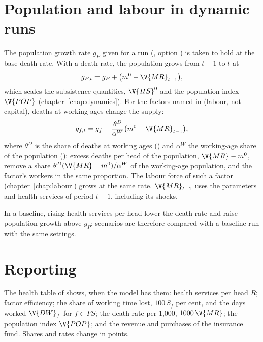 \section{Population and labour in dynamic runs}\label{sec:population}

The population growth rate $g_P$ given for a run (,
option ) is taken to hold at the base death rate. With a
death rate, the population grows from $t - 1$ to $t$ at
\begin{equation*}
g_{P,t} = g_P + \bigl(m^0 - \V{MR}_{t-1}\bigr),
\end{equation*}
which scales the subsistence quantities, $\V{HS}^0$ and the population index
$\V{POP}$ (chapter~\ref{chap:dynamics}). For the factors named in
 (labour, not capital), deaths at working ages change the
supply:
\begin{equation*}
g_{f,t} = g_f + \frac{\theta^D}{\alpha^W}\bigl(m^0 - \V{MR}_{t-1}\bigr),
\end{equation*}
where $\theta^D$ is the share of deaths at working ages ()
and $\alpha^W$ the working-age share of the population ():
excess deaths per head of the population, $\V{MR} - m^0$, remove a share
$\theta^D(\V{MR} - m^0)/\alpha^W$ of the working-age population, and the
factor's workers in the same proportion. The labour force of such a factor
(chapter~\ref{chap:labour}) grows at the same rate. $\V{MR}_{t-1}$ uses the
parameters and health services of period $t - 1$, including its shocks.

In a baseline, rising health services per head lower the death rate and raise
population growth above $g_P$; scenarios are therefore compared with a
baseline run with the same settings.

\section{Reporting}

The health table of  shows, when the model has them:
health services per head $R$; factor efficiency; the share of working time
lost, $100\,S_f$ per cent, and the days worked $\V{DW}_f$ for $f \in FS$; the
death rate per 1,000, $1000\,\V{MR}$; the population index $\V{POP}$; and the
revenue and purchases of the insurance fund. Shares and rates change in
points.
